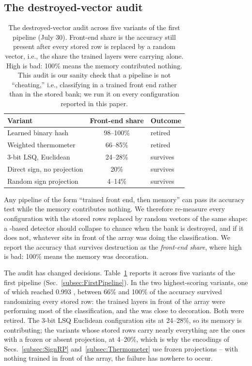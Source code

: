 \subsection{The destroyed-vector audit}
\label{subsec:Audit}
\label{subsec:AuditResults}
\begin{table}[t]
\centering
\caption{The destroyed-vector audit across five variants of the first
pipeline (July 30). Front-end share is the accuracy still present after
every stored row is replaced by a random vector, i.e., the share the
trained layers were carrying alone. High is bad: 100\% means the memory
contributed nothing. This audit is our sanity check that a pipeline is
not ``cheating,'' i.e., classifying in a trained front end rather than
in the stored bank; we run it on every configuration reported in this
paper.}
\label{tab:audit}
{\footnotesize
\begin{tabular}{@{}lcl@{}}
\toprule
\textbf{Variant} & \textbf{Front-end share} & \textbf{Outcome} \\
\midrule
Learned binary hash          & 98--100\% & retired \\
Weighted thermometer         & 66--85\%  & retired \\
3-bit LSQ, Euclidean         & 24--28\%  & survives \\
Direct sign, no projection   & 20\%      & survives \\
Random sign projection       & 4--14\%   & survives \\
\bottomrule
\end{tabular}}
\end{table}
Any pipeline of the form ``trained front end, then memory'' can pass
its accuracy test while the memory contributes nothing. We therefore
re-measure every configuration with the stored rows replaced by random
vectors of the same shape: a \cam-based detector should collapse to
chance when the bank is destroyed, and if it does not, whatever sits
in front of the array was doing the classification. We report the
accuracy that survives destruction as the \emph{front-end share},
where high is bad: 100\% means the memory was decoration.

The audit has changed decisions. Table~\ref{tab:audit} reports it
across five variants of the first pipeline
(Sec.~\ref{subsec:FirstPipeline}). In the two highest-scoring
variants, one of which reached 0.993 \auroc, between 66\% and 100\%
of the accuracy survived randomizing every stored row: the trained
layers in front of the array were performing most of the
classification, and the \cam was close to decoration. Both were
retired. The 3-bit LSQ Euclidean configuration sits at 24--28\%, so
its memory is contributing; the variants whose stored rows carry
nearly everything are the ones with a frozen or absent projection, at
4--20\%, which is why the encodings of Secs.~\ref{subsec:SignRP}
and~\ref{subsec:Thermometer} use frozen projections -- with nothing
trained in front of the array, the failure has nowhere to occur.

